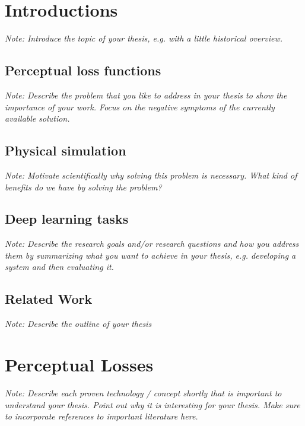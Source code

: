 \documentclass[a4paper,12pt,twoside]{report}
\begin{document}

\chapter{Introductions}

\textit{Note: Introduce the topic of your thesis, e.g. with a little historical overview.}

\section{Perceptual loss functions}

\textit{Note: Describe the problem that you like to address in your thesis to show the importance of your work. Focus on the negative symptoms of the currently available solution.}

\section{Physical simulation}

\textit{Note: Motivate scientifically why solving this problem is necessary. What kind of benefits do we have by solving the problem?}

\section{Deep learning tasks}

\textit{Note: Describe the research goals and/or research questions and how you address them by summarizing what you want to achieve in your thesis, e.g. developing a system and then evaluating it.}

\section{Related Work}

\textit{Note: Describe the outline of your thesis}





\chapter{Perceptual Losses}

\textit{Note: Describe each proven technology / concept shortly that is important to understand your thesis. Point out why it is interesting for your thesis. Make sure to incorporate references to important literature here.}
\end{document}

